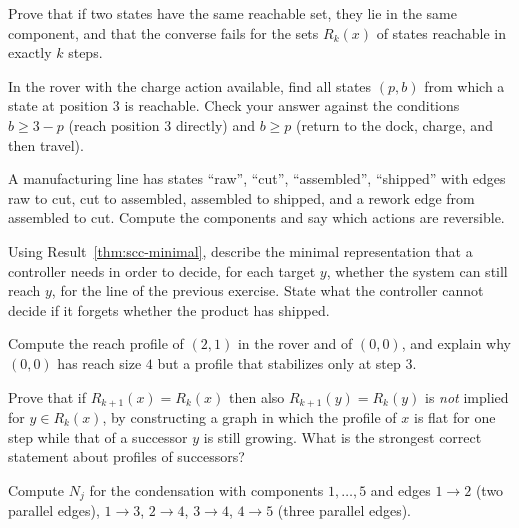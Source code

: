 \begin{exercise}
Prove that if two states have the same reachable set, they lie in the same component, and that the converse fails for the sets $R_k(x)$ of states reachable in exactly $k$ steps.
\end{exercise}

\begin{exercise}
In the rover with the charge action available, find all states $(p,b)$ from which a state at position $3$ is reachable. Check your answer against the conditions $b\ge3-p$ (reach position $3$ directly) and $b\ge p$ (return to the dock, charge, and then travel).
\end{exercise}

\begin{exercise}
A manufacturing line has states ``raw'', ``cut'', ``assembled'', ``shipped'' with edges raw to cut, cut to assembled, assembled to shipped, and a rework edge from assembled to cut. Compute the components and say which actions are reversible.
\end{exercise}

\begin{exercise}
Using Result~\ref{thm:scc-minimal}, describe the minimal representation that a controller needs in order to decide, for each target $y$, whether the system can still reach $y$, for the line of the previous exercise. State what the controller cannot decide if it forgets whether the product has shipped.
\end{exercise}

\begin{exercise}
Compute the reach profile of $(2,1)$ in the rover and of $(0,0)$, and explain why $(0,0)$ has reach size $4$ but a profile that stabilizes only at step $3$.
\end{exercise}

\begin{exercise}
Prove that if $R_{k+1}(x)=R_k(x)$ then also $R_{k+1}(y)=R_k(y)$ is \emph{not} implied for $y\in R_k(x)$, by constructing a graph in which the profile of $x$ is flat for one step while that of a successor $y$ is still growing. What is the strongest correct statement about profiles of successors?
\end{exercise}

\begin{exercise}
Compute $N_j$ for the condensation with components $1,\dots,5$ and edges $1\to2$ (two parallel edges), $1\to3$, $2\to4$, $3\to4$, $4\to5$ (three parallel edges).\label{ex2:paths}
\end{exercise}

